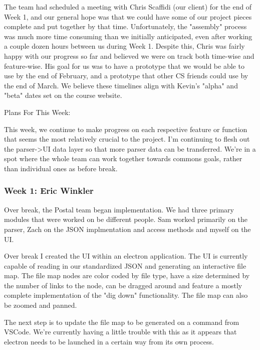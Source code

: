 The team had scheduled a meeting with Chris Scaffidi (our client) for the end of Week 1, and our general hope was that we could have some of our project pieces complete and put together by that time. Unfortunately, the "assembly" process was much more time consuming than we initially anticipated, even after working a couple dozen hours between us during Week 1. Despite this, Chris was fairly happy with our progress so far and believed we were on track both time-wise and feature-wise. His goal for us was to have a prototype that we would be able to use by the end of February, and a prototype that other CS friends could use by the end of March. We believe these timelines align with Kevin's "alpha" and "beta" dates set on the course website.



Plans For This Week:

This week, we continue to make progress on each respective feature or function that seems the most relatively crucial to the project. I'm continuing to flesh out the parser->UI data layer so that more parser data can be transferred. We're in a spot where the whole team can work together towards commons goals, rather than individual ones as before break. \\ 

 \subsubsection{Week 1: Eric Winkler}

Over break, the Postal team began implementation. We had three primary modules that were worked on be different people. Sam worked primarily on the parser, Zach on the JSON implmentation and access methods and myself on the UI.



Over break I created the UI within an electron application. The UI is currently capable of reading in our standardized JSON and generating an interactive file map. The file map nodes are color coded by file type, have a size determined by the number of links to the node, can be dragged around and feature a mostly complete implementation of the "dig down" functionality. The file map can also be zoomed and panned.



The next step is to update the file map to be generated on a command from VSCode. We're currently having a little trouble with this as it appears that electron needs to be launched in a certain way from its own process.



